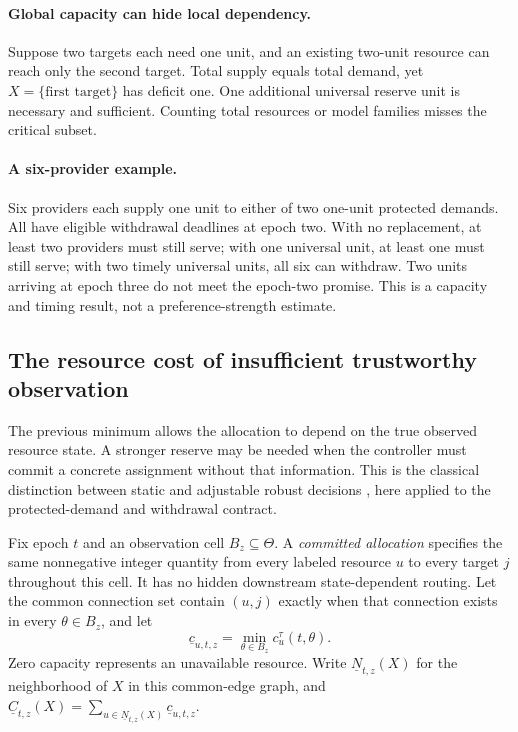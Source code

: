 \paragraph{Global capacity can hide local dependency.}
Suppose two targets each need one unit, and an existing two-unit resource can reach only the second target. Total supply equals total demand, yet $X=\{\text{first target}\}$ has deficit one. One additional universal reserve unit is necessary and sufficient. Counting total resources or model families misses the critical subset.

\paragraph{A six-provider example.}
Six providers each supply one unit to either of two one-unit protected demands. All have eligible withdrawal deadlines at epoch two. With no replacement, at least two providers must still serve; with one universal unit, at least one must still serve; with two timely universal units, all six can withdraw. Two units arriving at epoch three do not meet the epoch-two promise. This is a capacity and timing result, not a preference-strength estimate.

\subsection{The resource cost of insufficient trustworthy observation}
\label{sec:information-price}
The previous minimum allows the allocation to depend on the true observed resource state. A stronger reserve may be needed when the controller must commit a concrete assignment without that information. This is the classical distinction between static and adjustable robust decisions \cite{bental}, here applied to the protected-demand and withdrawal contract.

Fix epoch $t$ and an observation cell $B_z\subseteq\Theta$. A \emph{committed allocation} specifies the same nonnegative integer quantity from every labeled resource $u$ to every target $j$ throughout this cell. It has no hidden downstream state-dependent routing. Let the common connection set contain $(u,j)$ exactly when that connection exists in every $\theta\in B_z$, and let
\[
\underline c_{u,t,z}=\min_{\theta\in B_z}c^\tau_u(t,\theta).
\]
Zero capacity represents an unavailable resource. Write $\underline N_{t,z}(X)$ for the neighborhood of $X$ in this common-edge graph, and $\underline C_{t,z}(X)=\sum_{u\in\underline N_{t,z}(X)}\underline c_{u,t,z}$.

